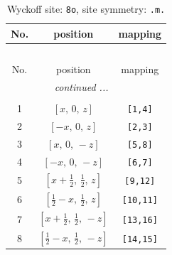 \documentclass[fleqn,8pt]{jsarticle}
\begin{document}
\begin{longtable}{ccc}
\caption{Wyckoff site: {\tt 8o}, site symmetry: {\tt .m.}}
 \\
 \hline \hline
No. & position & mapping \\ \hline \endfirsthead

\multicolumn{2}{l}{\tablename\ \thetable{}} \\
 \hline \hline
No. & position & mapping \\ \hline \endhead

 \hline \hline
\multicolumn{2}{r}{\footnotesize\it continued ...} \\ \endfoot

 \hline \hline
\multicolumn{2}{r}{} \\ \endlastfoot

1 & $\left[ x,\, 0,\, z \right]$ & {\tt [1,4]} \\ \hline
2 & $\left[ - x,\, 0,\, z \right]$ & {\tt [2,3]} \\ \hline
3 & $\left[ x,\, 0,\, - z \right]$ & {\tt [5,8]} \\ \hline
4 & $\left[ - x,\, 0,\, - z \right]$ & {\tt [6,7]} \\ \hline
5 & $\left[ x + \frac{1}{2},\, \frac{1}{2},\, z \right]$ & {\tt [9,12]} \\ \hline
6 & $\left[ \frac{1}{2} - x,\, \frac{1}{2},\, z \right]$ & {\tt [10,11]} \\ \hline
7 & $\left[ x + \frac{1}{2},\, \frac{1}{2},\, - z \right]$ & {\tt [13,16]} \\ \hline
8 & $\left[ \frac{1}{2} - x,\, \frac{1}{2},\, - z \right]$ & {\tt [14,15]} \\
\end{longtable}
\renewcommand{\arraystretch}{1.2}
\end{document}
